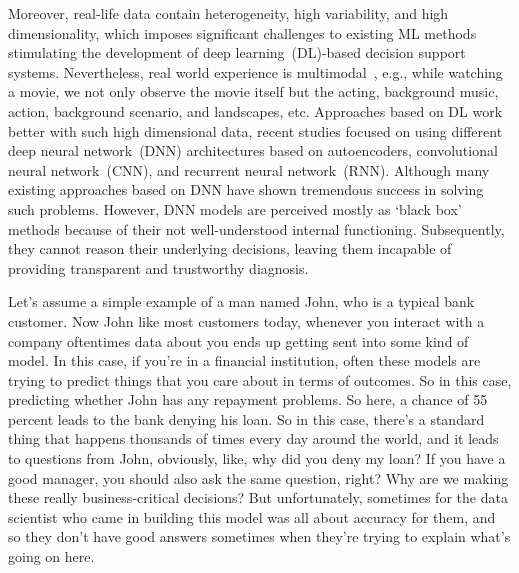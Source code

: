 \hspace*{3.5mm} Moreover, real-life data contain heterogeneity, high variability, and high dimensionality, which imposes significant challenges to existing ML methods stimulating the development of deep learning~(DL)-based decision support systems. Nevertheless, real world experience is multimodal~\cite{mmsurvey}, e.g., while watching a movie, we not only observe the movie itself but the acting, background music, action, background scenario, and landscapes, etc. Approaches based on DL work better with such high dimensional data, recent studies focused on using different deep neural network~(DNN) architectures based on autoencoders, convolutional neural network~(CNN), and recurrent neural network~(RNN). Although many existing approaches based on DNN have shown tremendous success in solving such problems. However, DNN models are perceived mostly as `black box' methods because of their not well-understood internal functioning. Subsequently, they cannot reason their underlying decisions, leaving them incapable of providing transparent and trustworthy diagnosis. 

Let's assume a simple example of a man named John, who is a typical bank customer. Now John like most customers today, whenever you interact with a company oftentimes data
about you ends up getting sent into some kind of model. In this case, if you're in a financial institution, often these models are trying to predict 
things that you care about in terms of outcomes. So in this case, predicting whether John has any repayment problems. So here, a chance of 55 percent leads to the bank denying his loan. So in this case, there's a standard thing that happens
thousands of times every day around the world, and it leads to questions from John, obviously, like, why did you deny my loan?
If you have a good manager, you should also ask the same question, right? Why are we making these really business-critical decisions?
But unfortunately, sometimes for the data scientist who came in building this model was all about accuracy for them,
and so they don't have good answers sometimes when they're trying to explain what's going on here.

